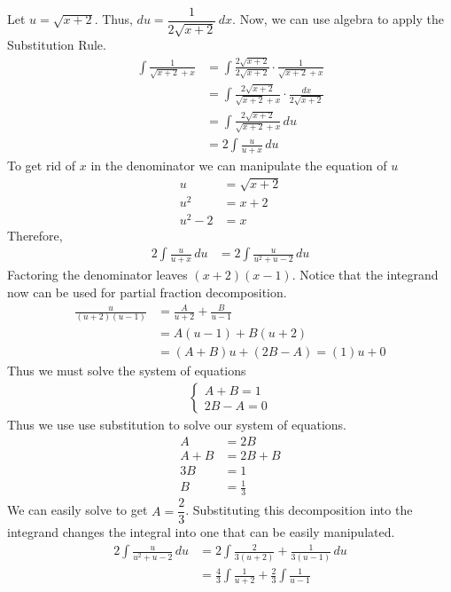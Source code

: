 \documentclass{article}
\begin{document}
\begin{enumerate}[label=\textbf{(4.\arabic*)}]
Let $u=\sqrt{x+2}$. Thus, $du=\dfrac{1}{2\sqrt{x+2}}\,dx$. Now, we can use algebra to apply the Substitution Rule.
\begin{align*}
    \int\!\frac{1}{\sqrt{x+2}+x}&=\int\!\frac{2\sqrt{x+2}}{2\sqrt{x+2}}\cdot\frac{1}{\sqrt{x+2}+x} \\
    &=\int\!\frac{2\sqrt{x+2}}{\sqrt{x+2}+x}\cdot\frac{dx}{2\sqrt{x+2}} \\
    &=\int\!\frac{2\sqrt{x+2}}{\sqrt{x+2}+x}\, du \\
    &=2\int\!\frac{u}{u+x}\, du
\end{align*}
To get rid of $x$ in the denominator we can manipulate the equation of $u$
\begin{align*}
    u&=\sqrt{x+2} \\
    u^2 &= x+2 \\
    u^2-2 &= x
\end{align*}
Therefore,
\begin{align*}
    2\int\!\frac{u}{u+x}\, du &= 2\int\!\frac{u}{u^2+u-2}\, du
\end{align*}
Factoring the denominator leaves $(x+2)(x-1)$. Notice that the integrand now can be used for partial fraction decomposition.
\begin{align*}
    \frac{u}{(u+2)(u-1)}&=\frac{A}{u+2}+\frac{B}{u-1} \\
    &=A(u-1)+B(u+2) \\
    &=(A+B)u+(2B-A) = (1)u+0
\end{align*}
Thus we must solve the system of equations
\begin{align*}
    \begin{cases}
        A+B=1 \\
        2B-A=0
    \end{cases}
\end{align*}
Thus we use use substitution to solve our system of equations.
\begin{align*}
    A&=2B \\
    A+B&=2B+B \\
    3B&=1 \\
    B&=\frac{1}{3}
\end{align*}
We can easily solve to get $A=\dfrac{2}{3}$. Substituting this decomposition into the integrand changes the integral into one that can be easily manipulated.
\begin{align*}
    2\int\!\frac{u}{u^2+u-2}\, du&=2\int\!\frac{2}{3(u+2)}+\frac{1}{3(u-1)}\,du \\
    &=\frac{4}{3}\int\!\frac{1}{u+2}+\frac{2}{3}\int\!\frac{1}{u-1} \\

\end{align*}
\end{enumerate}
\end{document}
